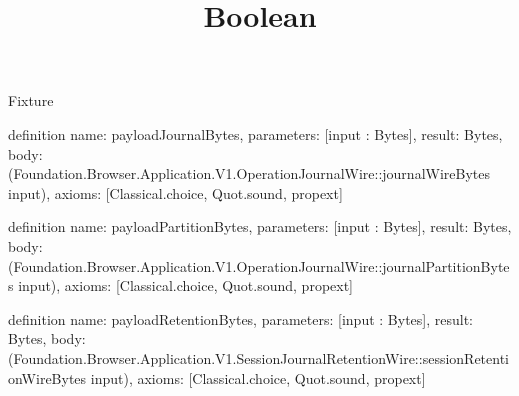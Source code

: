 \begin{lexlean}{Fixture}
\title{Boolean}
\begin{semanticmodule}
definition{
  name: payloadJournalBytes,
  parameters: [input : Bytes],
  result: Bytes,
  body: (Foundation.Browser.Application.V1.OperationJournalWire::journalWireBytes input),
  axioms: [Classical.choice, Quot.sound, propext]
}

definition{
  name: payloadPartitionBytes,
  parameters: [input : Bytes],
  result: Bytes,
  body: (Foundation.Browser.Application.V1.OperationJournalWire::journalPartitionBytes input),
  axioms: [Classical.choice, Quot.sound, propext]
}

definition{
  name: payloadRetentionBytes,
  parameters: [input : Bytes],
  result: Bytes,
  body: (Foundation.Browser.Application.V1.SessionJournalRetentionWire::sessionRetentionWireBytes input),
  axioms: [Classical.choice, Quot.sound, propext]
}
\end{semanticmodule}
\end{lexlean}

